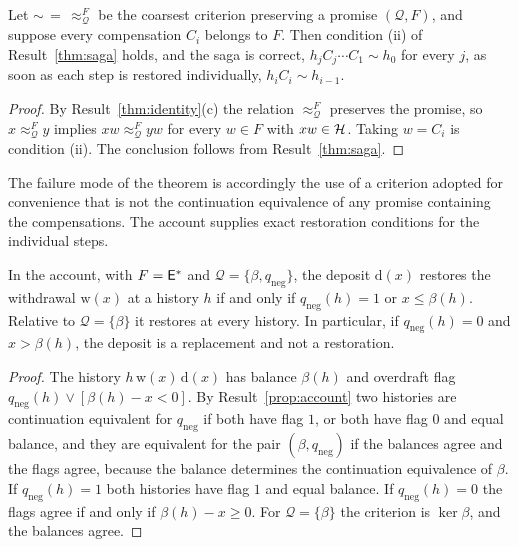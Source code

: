 \begin{newresult}\label{cor:saga-free}
Let $\sim\,=\,\approx^{F}_{\mathcal Q}$ be the coarsest criterion preserving a promise $(\mathcal Q,F)$, and suppose every compensation $C_i$ belongs to $F$. Then condition (ii) of Result~\ref{thm:saga} holds, and the saga is correct, $h_jC_j\cdots C_1\sim h_0$ for every $j$, as soon as each step is restored individually, $h_iC_i\sim h_{i-1}$.
\end{newresult}
\begin{proof}
By Result~\ref{thm:identity}(c) the relation $\approx^{F}_{\mathcal Q}$ preserves the promise, so $x\approx^{F}_{\mathcal Q}y$ implies $xw\approx^{F}_{\mathcal Q}yw$ for every $w\in F$ with $xw\in\mathcal{H}$. Taking $w=C_i$ is condition (ii). The conclusion follows from Result~\ref{thm:saga}.
\end{proof}

The failure mode of the theorem is accordingly the use of a criterion adopted for convenience that is not the continuation equivalence of any promise containing the compensations. The account supplies exact restoration conditions for the individual steps.

\begin{newresult}\label{prop:withdrawal-restored}
In the account, with $F=\mathsf{E}^{*}$ and $\mathcal Q=\{\beta,q_{\mathrm{neg}}\}$, the deposit $\mathrm{d}(x)$ restores the withdrawal $\mathrm{w}(x)$ at a history $h$ if and only if $q_{\mathrm{neg}}(h)=1$ or $x\le\beta(h)$. Relative to $\mathcal Q=\{\beta\}$ it restores at every history. In particular, if $q_{\mathrm{neg}}(h)=0$ and $x>\beta(h)$, the deposit is a replacement and not a restoration.
\end{newresult}
\begin{proof}
The history $h\,\mathrm{w}(x)\,\mathrm{d}(x)$ has balance $\beta(h)$ and overdraft flag $q_{\mathrm{neg}}(h)\vee[\beta(h)-x<0]$. By Result~\ref{prop:account} two histories are continuation equivalent for $q_{\mathrm{neg}}$ if both have flag $1$, or both have flag $0$ and equal balance, and they are equivalent for the pair $(\beta,q_{\mathrm{neg}})$ if the balances agree and the flags agree, because the balance determines the continuation equivalence of $\beta$. If $q_{\mathrm{neg}}(h)=1$ both histories have flag $1$ and equal balance. If $q_{\mathrm{neg}}(h)=0$ the flags agree if and only if $\beta(h)-x\ge0$. For $\mathcal Q=\{\beta\}$ the criterion is $\ker\beta$, and the balances agree.
\end{proof}

